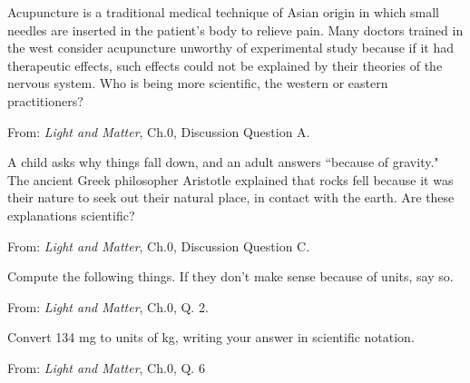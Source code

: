 \documentclass[addpoints,12pt]{exam}
\begin{document}
\begin{questions}
\question[5]
Acupuncture is a traditional medical technique of Asian origin in which small needles are inserted in the patient’s body to relieve pain. Many doctors trained in the west consider acupuncture unworthy of experimental study because if it had therapeutic effects, such effects could not be explained by their theories of the nervous system. Who is being more scientific, the western or eastern practitioners?

From: \textit{Light and Matter}, Ch.0, Discussion Question A.
\fillwithlines{2.5in}

\question[5]
A child asks why things fall down, and an adult answers ``because of gravity." The ancient Greek philosopher Aristotle explained that rocks fell because it was their nature to seek out their natural place, in contact with the earth. Are these explanations scientific? 

From: \textit{Light and Matter}, Ch.0, Discussion Question C.
\fillwithlines{2.5in}

\question[4]
Compute the following things. If they don't make sense because of units, say so.

From: \textit{Light and Matter}, Ch.0, Q. 2.

\question[2]
Convert 134 mg to units of kg, writing your answer in scientific notation.

From: \textit{Light and Matter}, Ch.0, Q. 6
\vspace{0.5in}


\end{questions}
\end{document}
